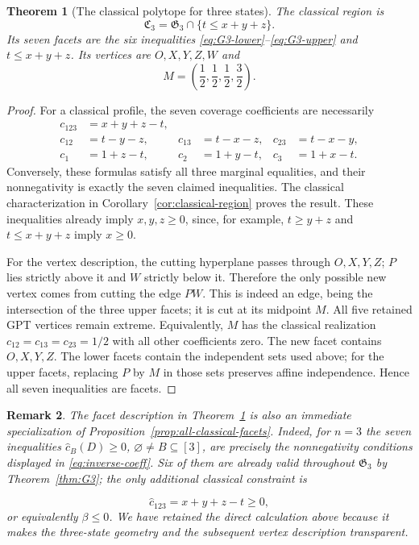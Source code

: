 \documentclass[10pt,a4paper]{amsart}
\newtheorem{theorem}{Theorem}[section]
\newtheorem{remark}[theorem]{Remark}
\newcommand{\1}{\mathbf 1}
\newcommand{\Creg}{\mathfrak C}
\newcommand{\Greg}{\mathfrak G}
\begin{document}
\begin{theorem}[The classical polytope for three states]\label{thm:C3}
The classical region is
\begin{equation}\label{eq:C3-cut}
 \Creg_3=\Greg_3\cap\{t\le x+y+z\}.
\end{equation}
Its seven facets are the six inequalities
\eqref{eq:G3-lower}--\eqref{eq:G3-upper} and $t\le x+y+z$.
Its vertices are $O,X,Y,Z,W$ and
\begin{equation}\label{eq:M-vertex}
 M=\left(\frac12,\frac12,\frac12,\frac32\right).
\end{equation}
\end{theorem}
\begin{proof}
For a classical profile, the seven coverage coefficients are necessarily
\begin{align}
 c_{123}&=x+y+z-t,\nonumber\\
 c_{12}&=t-y-z,&c_{13}&=t-x-z,&c_{23}&=t-x-y,\label{eq:inverse-coeff}\\
 c_1&=1+z-t,&c_2&=1+y-t,&c_3&=1+x-t.\nonumber
\end{align}
Conversely, these formulas satisfy all three marginal equalities, and their
nonnegativity is exactly the seven claimed inequalities. The classical
characterization in Corollary~\ref{cor:classical-region} proves the result.
These inequalities already imply $x,y,z\ge0$, since, for example,
$t\ge y+z$ and $t\le x+y+z$ imply $x\ge0$.

For the vertex description, the cutting hyperplane passes through $O,X,Y,Z$;
$P$ lies strictly above it and $W$ strictly below it. Therefore the only possible
new vertex comes from cutting the edge $PW$. This is indeed an edge, being the
intersection of the three upper facets; it is cut at its midpoint $M$.
All five retained GPT vertices remain extreme. Equivalently, $M$ has the
classical realization $c_{12}=c_{13}=c_{23}=1/2$ with all other coefficients
zero. The new facet contains $O,X,Y,Z$. The lower facets contain the independent
sets used above; for the upper facets, replacing $P$ by $M$ in those sets
preserves affine independence. Hence all seven inequalities are facets.
\end{proof}

\begin{remark}
	The facet description in Theorem~\ref{thm:C3} is also an immediate specialization of Proposition~\ref{prop:all-classical-facets}. Indeed, for $n=3$ the seven inequalities $\widehat c_B(D)\ge0$, $\varnothing\ne B\subseteq[3]$, are precisely the nonnegativity conditions displayed in \eqref{eq:inverse-coeff}. Six of them are already valid throughout $\Greg_3$ by Theorem~\ref{thm:G3}; the only additional classical constraint is
	
	$$
	\widehat c_{123}=x+y+z-t\ge0,
	$$
	or equivalently $\beta\le0$. We have retained the direct calculation above because it makes the three-state geometry and the subsequent vertex description transparent.
\end{remark}
\end{document}
